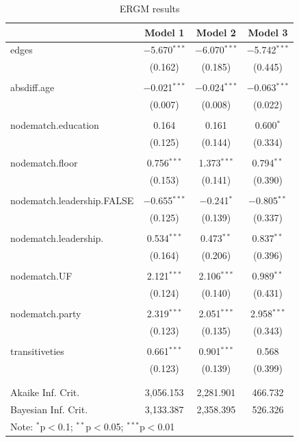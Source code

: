 \documentclass[fleqn,12pt]{wlscirep}
\begin{document}
\begin{table}
\begin{center}
\begin{tabular}{l c c c }
\hline
 & Model 1 & Model 2 & Model 3 \\
\hline
 edges & $-$5.670$^{***}$ & $-$6.070$^{***}$ & $-$5.742$^{***}$ \\ 
  & (0.162) & (0.185) & (0.445) \\ 
  & & & \\ 
 absdiff.age & $-$0.021$^{***}$ & $-$0.024$^{***}$ & $-$0.063$^{***}$ \\ 
  & (0.007) & (0.008) & (0.022) \\ 
  & & & \\ 
 nodematch.education & 0.164 & 0.161 & 0.600$^{*}$ \\ 
  & (0.125) & (0.144) & (0.334) \\ 
  & & & \\ 
 nodematch.floor & 0.756$^{***}$ & 1.373$^{***}$ & 0.794$^{**}$ \\ 
  & (0.153) & (0.141) & (0.390) \\ 
  & & & \\ 
 nodematch.leadership.FALSE & $-$0.655$^{***}$ & $-$0.241$^{*}$ & $-$0.805$^{**}$ \\ 
  & (0.125) & (0.139) & (0.337) \\ 
  & & & \\ 
 nodematch.leadership. & 0.534$^{***}$ & 0.473$^{**}$ & 0.837$^{**}$ \\ 
  & (0.164) & (0.206) & (0.396) \\ 
  & & & \\ 
 nodematch.UF & 2.121$^{***}$ & 2.106$^{***}$ & 0.989$^{**}$ \\ 
  & (0.124) & (0.140) & (0.431) \\ 
  & & & \\ 
 nodematch.party & 2.319$^{***}$ & 2.051$^{***}$ & 2.958$^{***}$ \\ 
  & (0.123) & (0.135) & (0.343) \\ 
  & & & \\ 
 transitiveties & 0.661$^{***}$ & 0.901$^{***}$ & 0.568 \\ 
  & (0.123) & (0.139) & (0.399) \\ 
  & & & \\ 
\hline \\[-1.8ex] 
Akaike Inf. Crit. & 3,056.153 & 2,281.901 & 466.732 \\ 
Bayesian Inf. Crit. & 3,133.387 & 2,358.395 & 526.326 \\ 
\hline
\multicolumn{4}{l}{\scriptsize{Note: {$^{*}$p$<$0.1; $^{**}$p$<$0.05; $^{***}$p$<$0.01}}}
\end{tabular}
\caption{ERGM results}
\label{table:coefficients}
\end{center}
\end{table}
\end{document}
